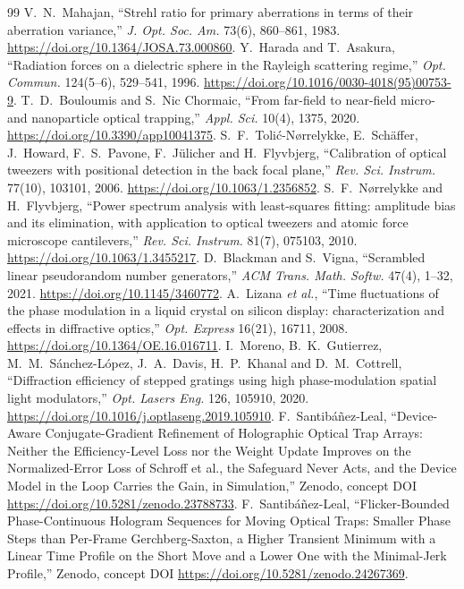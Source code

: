 \begin{thebibliography}{99}
 V.~N.~Mahajan, ``Strehl ratio for primary aberrations in terms of their aberration variance,'' \emph{J. Opt. Soc. Am.} 73(6), 860--861, 1983. \url{https://doi.org/10.1364/JOSA.73.000860}.
 Y.~Harada and T.~Asakura, ``Radiation forces on a dielectric sphere in the Rayleigh scattering regime,'' \emph{Opt. Commun.} 124(5--6), 529--541, 1996. \url{https://doi.org/10.1016/0030-4018(95)00753-9}.
 T.~D.~Bouloumis and S.~Nic Chormaic, ``From far-field to near-field micro- and nanoparticle optical trapping,'' \emph{Appl. Sci.} 10(4), 1375, 2020. \url{https://doi.org/10.3390/app10041375}.
 S.~F.~Toli\'c-N{\o}rrelykke, E.~Sch\"affer, J.~Howard, F.~S.~Pavone, F.~J\"ulicher and H.~Flyvbjerg, ``Calibration of optical tweezers with positional detection in the back focal plane,'' \emph{Rev. Sci. Instrum.} 77(10), 103101, 2006. \url{https://doi.org/10.1063/1.2356852}.
 S.~F.~N{\o}rrelykke and H.~Flyvbjerg, ``Power spectrum analysis with least-squares fitting: amplitude bias and its elimination, with application to optical tweezers and atomic force microscope cantilevers,'' \emph{Rev. Sci. Instrum.} 81(7), 075103, 2010. \url{https://doi.org/10.1063/1.3455217}.
 D.~Blackman and S.~Vigna, ``Scrambled linear pseudorandom number generators,'' \emph{ACM Trans. Math. Softw.} 47(4), 1--32, 2021. \url{https://doi.org/10.1145/3460772}.
 A.~Lizana \emph{et al.}, ``Time fluctuations of the phase modulation in a liquid crystal on silicon display: characterization and effects in diffractive optics,'' \emph{Opt. Express} 16(21), 16711, 2008. \url{https://doi.org/10.1364/OE.16.016711}.
 I.~Moreno, B.~K.~Gutierrez, M.~M.~S\'anchez-L\'opez, J.~A.~Davis, H.~P.~Khanal and D.~M.~Cottrell, ``Diffraction efficiency of stepped gratings using high phase-modulation spatial light modulators,'' \emph{Opt. Lasers Eng.} 126, 105910, 2020. \url{https://doi.org/10.1016/j.optlaseng.2019.105910}.
 F.~Santib\'a\~nez-Leal, ``Device-Aware Conjugate-Gradient Refinement of Holographic Optical Trap Arrays: Neither the Efficiency-Level Loss nor the Weight Update Improves on the Normalized-Error Loss of Schroff et al., the Safeguard Never Acts, and the Device Model in the Loop Carries the Gain, in Simulation,'' Zenodo, concept DOI \url{https://doi.org/10.5281/zenodo.23788733}.
 F.~Santib\'a\~nez-Leal, ``Flicker-Bounded Phase-Continuous Hologram Sequences for Moving Optical Traps: Smaller Phase Steps than Per-Frame Gerchberg-Saxton, a Higher Transient Minimum with a Linear Time Profile on the Short Move and a Lower One with the Minimal-Jerk Profile,'' Zenodo, concept DOI \url{https://doi.org/10.5281/zenodo.24267369}.

\end{thebibliography}
